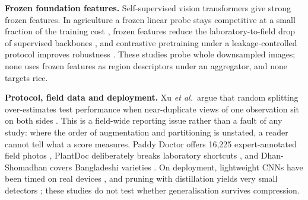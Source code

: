 \textbf{Frozen foundation features.} Self-supervised vision transformers \cite{oquab2024, simeoni2025dinov3,
darcet2024registers} give strong frozen features. In agriculture a frozen linear probe stays competitive at a small
fraction of the training cost \cite{dinoagri2025}, frozen features reduce the laboratory-to-field drop of supervised
backbones \cite{nguyen2026}, and contrastive pretraining under a leakage-controlled protocol improves robustness
\cite{plantclr2026}. These studies probe whole downsampled images; none uses frozen features as region descriptors under
an aggregator, and none targets rice.

\textbf{Protocol, field data and deployment.} Xu \textit{et al.}\ argue that random splitting over-estimates test
performance when near-duplicate views of one observation sit on both sides \cite{xu2024}. This is a field-wide
reporting issue rather than a fault of any study: where the order of augmentation and partitioning is unstated, a
reader cannot tell what a score measures. Paddy Doctor offers 16{,}225 expert-annotated field photos
\cite{petchiammal2023}, PlantDoc deliberately breaks laboratory shortcuts \cite{singh2020}, and Dhan-Shomadhan covers
Bangladeshi varieties \cite{hossain2021}. On deployment, lightweight CNNs have been timed on real devices
\cite{edge2026}, and pruning with distillation \cite{hinton2015distilling} yields very small detectors \cite{liu2025};
these studies do not test whether generalisation survives compression.
